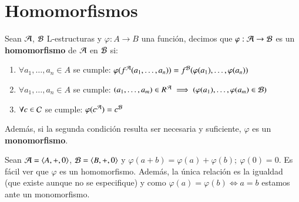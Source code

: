 \section{Homomorfismos}
\begin{dfn}
    Sean $\mathcal{A}$, $\mathcal{B}$ L-estructuras y $\varphi: A \to B$ una función, decimos que $\varphi: \mathcal{A} \to \mathcal{B}$ es un \textbf{homomorfismo} de $\mathcal{A}$ en $\mathcal{B}$ si:
    \begin{enumerate}
        \item $\forall a_1, \ldots, a_n \in A$ se cumple: $\varphi(f^{\mathcal{A}}(a_1, \ldots, a_n)) = f^{\mathcal{B}}(\varphi(a_1), \ldots, \varphi(a_n))$
        \item $\forall a_1, \ldots, a_n \in A$ se cumple: $(a_1, \ldots, a_m) \in R^{\mathcal{A}} \implies (\varphi(a_1), \ldots, \varphi(a_m) \in \mathcal{B})$
        \item $\forall c \in \mathcal{C}$ se cumple: $\varphi(c^{\mathcal{A}}) = c^{\mathcal{B}}$
    \end{enumerate}
    Además, si la segunda condición resulta ser necesaria y suficiente, $\varphi$ es un \textbf{monomorfismo}.
\end{dfn}
\begin{eg}
    Sean $\mathcal{A} = \langle A, +, 0\rangle$, $\mathcal{B} = \langle B, +, 0\rangle$ y $\varphi(a+b) = \varphi(a) + \varphi(b);\ \varphi(0)=0$. Es fácil ver que $\varphi$ es un homomorfismo. Además, la única relación es la igualdad (que existe aunque no se especifique) y como $\varphi(a) = \varphi(b) \iff a = b$ estamos ante un monomorfismo.
\end{eg}

